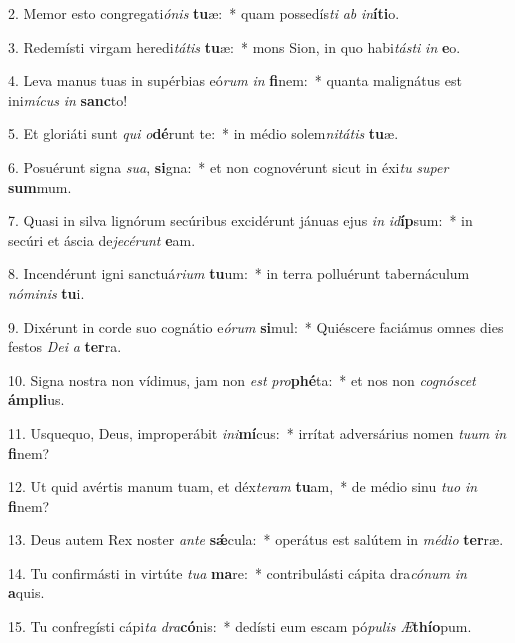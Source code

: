 2. Memor esto congregati\textit{ó}\textit{nis} \textbf{tu}æ:~*  quam possedís\textit{ti} \textit{ab} \textit{in}\textbf{í}\textbf{ti}o.\

3. Redemísti virgam heredi\textit{tá}\textit{tis} \textbf{tu}æ:~*  mons Sion, in quo habi\textit{tás}\textit{ti} \textit{in} \textbf{e}o.\

4. Leva manus tuas in supérbias eó\textit{rum} \textit{in} \textbf{fi}nem:~*  quanta malignátus est ini\textit{mí}\textit{cus} \textit{in} \textbf{sanc}to!\

5. Et gloriáti sunt \textit{qui} \textit{o}\textbf{dé}runt te:~*  in médio solem\textit{ni}\textit{tá}\textit{tis} \textbf{tu}æ.\

6. Posuérunt signa \textit{su}\textit{a}, \textbf{si}gna:~*  et non cognovérunt sicut in éxi\textit{tu} \textit{su}\textit{per} \textbf{sum}mum.\

7. Quasi in silva lignórum secúribus excidérunt jánuas ejus \textit{in} \textit{id}\textbf{íp}sum:~*  in secúri et áscia de\textit{je}\textit{cé}\textit{runt} \textbf{e}am.\

8. Incendérunt igni sanctuá\textit{ri}\textit{um} \textbf{tu}um:~*  in terra polluérunt tabernáculum \textit{nó}\textit{mi}\textit{nis} \textbf{tu}i.\

9. Dixérunt in corde suo cognátio e\textit{ó}\textit{rum} \textbf{si}mul:~*  Quiéscere faciámus omnes dies festos \textit{De}\textit{i} \textit{a} \textbf{ter}ra.\

10. Signa nostra non vídimus, jam non \textit{est} \textit{pro}\textbf{phé}ta:~*  et nos non \textit{co}\textit{gnó}\textit{scet} \textbf{ám}\textbf{pli}us.\

11. Usquequo, Deus, improperábit \textit{in}\textit{i}\textbf{mí}cus:~*  irrítat adversárius nomen \textit{tu}\textit{um} \textit{in} \textbf{fi}nem?\

12. Ut quid avértis manum tuam, et déx\textit{te}\textit{ram} \textbf{tu}am,~*  de médio sinu \textit{tu}\textit{o} \textit{in} \textbf{fi}nem?\

13. Deus autem Rex noster \textit{an}\textit{te} \textbf{sǽ}cula:~*  operátus est salútem in \textit{mé}\textit{di}\textit{o} \textbf{ter}ræ.\

14. Tu confirmásti in virtúte \textit{tu}\textit{a} \textbf{ma}re:~*  contribulásti cápita dra\textit{có}\textit{num} \textit{in} \textbf{a}quis.\

15. Tu confregísti cápi\textit{ta} \textit{dra}\textbf{có}nis:~*  dedísti eum escam pó\textit{pu}\textit{lis} \textit{Æ}\textbf{thí}\textbf{o}pum.\

